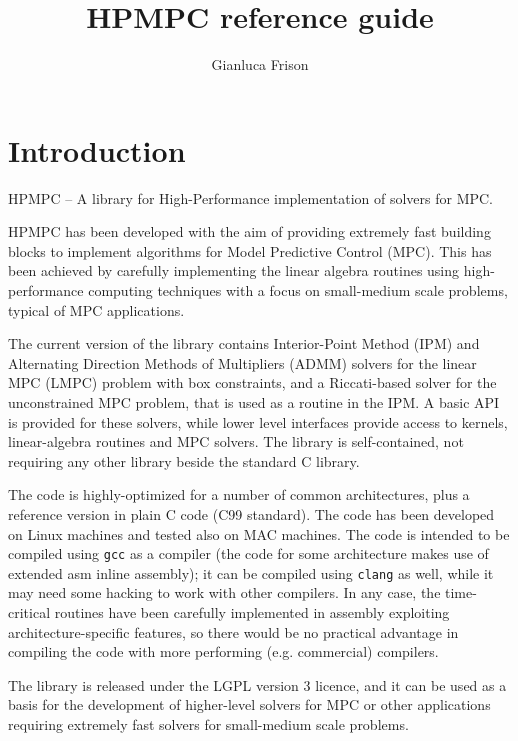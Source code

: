 \documentclass[a4paper]{report}
\title{HPMPC reference guide}
\author{Gianluca Frison}
\begin{document}
\maketitle
\tableofcontents

\chapter{Introduction}

HPMPC -- A library for High-Performance implementation of solvers for MPC.

HPMPC has been developed with the aim of providing extremely fast building blocks to implement algorithms for Model Predictive Control (MPC). 
This has been achieved by carefully implementing the linear algebra routines using high-performance computing techniques with a focus on small-medium scale problems, typical of MPC applications.

The current version of the library contains Interior-Point Method (IPM) and Alternating Direction Methods of Multipliers (ADMM) solvers for the linear MPC (LMPC) problem with box constraints, and a Riccati-based solver for the unconstrained MPC problem, that is used as a routine in the IPM.
A basic API is provided for these solvers, while lower level interfaces provide access to kernels, linear-algebra routines and MPC solvers.
The library is self-contained, not requiring any other library beside the standard C library.

The code is highly-optimized for a number of common architectures, plus a reference version in plain C code (C99 standard).
The code has been developed on Linux machines and tested also on MAC machines. 
The code is intended to be compiled using {\tt gcc} as a compiler (the code for some architecture makes use of extended asm inline assembly); it can be compiled using {\tt clang} as well, while it may need some hacking to work with other compilers.
In any case, the time-critical routines have been carefully implemented in assembly exploiting architecture-specific features, so there would be no practical advantage in compiling the code with more performing (e.g. commercial) compilers.

The library is released under the LGPL version 3 licence, and it can be used as a basis for the development of higher-level solvers for MPC or other applications requiring extremely fast solvers for small-medium scale problems.
\end{document}
